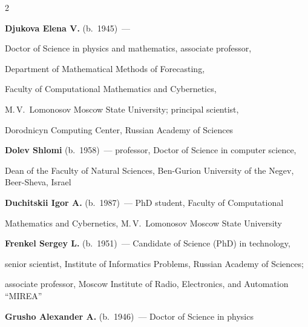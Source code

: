 \begin{multicols}{2}
\vspace*{4pt}



\noindent

\textbf{Djukova Elena V.} (b.\ 1945)~--- 

Doctor of Science in physics and mathematics, associate professor,

Department of Mathematical Methods of Forecasting,

Faculty of Computational Mathematics and Cybernetics, 

M.\,V.~Lomonosov Moscow State University; principal scientist, 

Dorodnicyn Computing Center, Russian Academy of Sciences  



\vspace*{4pt}



\noindent

\textbf{Dolev Shlomi} (b.\ 1958)~--- professor, Doctor of Science in computer science,

Dean of the Faculty of Natural Sciences, Ben-Gurion University of the Negev, Beer-Sheva, Israel



\vspace*{4pt}



\noindent 

\textbf{Duchitskii Igor A.} (b.\ 1987)~--- PhD student, Faculty of Computational

Mathematics and Cybernetics, M.\,V.~Lomonosov Moscow State University



\vspace*{4pt}



\noindent

\textbf{Frenkel Sergey L.} (b.\ 1951)~--- Candidate of Science (PhD) in technology,

senior scientist, Institute of Informatics Problems, Russian Academy of Sciences;

associate professor, Moscow Institute of Radio, Electronics, and Automation ``MIREA''



\vspace*{4pt}



\noindent

\textbf{Grusho Alexander A.} (b.\ 1946)~--- Doctor of Science in physics 


\end{multicols}
